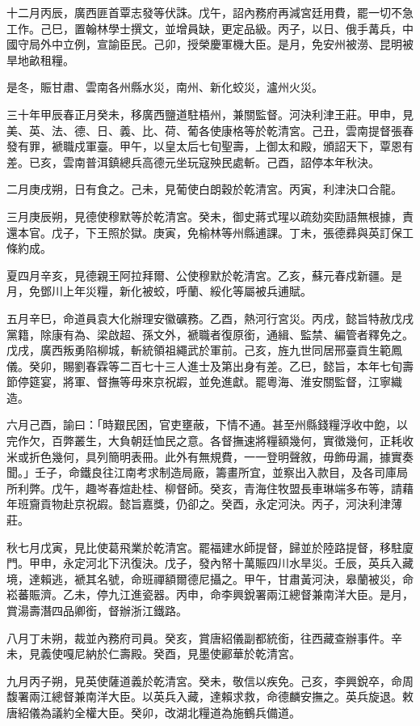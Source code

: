 \begin{pinyinscope}
十二月丙辰，廣西匪首覃志發等伏誅。戊午，詔內務府再減宮廷用費，罷一切不急工作。己巳，置翰林學士撰文，並增員缺，更定品級。丙子，以日、俄手冓兵，中國守局外中立例，宣諭臣民。己卯，授榮慶軍機大臣。是月，免安州被澇、昆明被旱地畝租糧。

是冬，賑甘肅、雲南各州縣水災，南州、新化蛟災，瀘州火災。

三十年甲辰春正月癸未，移廣西鹽道駐梧州，兼關監督。河決利津王莊。甲申，見美、英、法、德、日、義、比、荷、葡各使康格等於乾清宮。己丑，雲南提督張春發有罪，褫職戍軍臺。甲午，以皇太后七旬聖壽，上御太和殿，頒詔天下，覃恩有差。已亥，雲南普洱鎮總兵高德元坐玩寇殃民處斬。己酉，詔停本年秋決。

二月庚戌朔，日有食之。己未，見葡使白朗穀於乾清宮。丙寅，利津決口合龍。

三月庚辰朔，見德使穆默等於乾清宮。癸未，御史蔣式瑆以疏劾奕劻語無根據，責還本官。戊子，下王照於獄。庚寅，免榆林等州縣逋課。丁未，張德彞與英訂保工條約成。

夏四月辛亥，見德親王阿拉拜爾、公使穆默於乾清宮。乙亥，蘇元春戍新疆。是月，免鄧川上年災糧，新化被蛟，呼蘭、綏化等屬被兵逋賦。

五月辛巳，命道員袁大化辦理安徽礦務。乙酉，熱河行宮災。丙戌，懿旨特赦戊戌黨籍，除康有為、梁啟超、孫文外，褫職者復原銜，通緝、監禁、編管者釋免之。戊戌，廣西叛勇陷柳城，斬統領祖繩武於軍前。己亥，旌九世同居邢臺貢生範鳳儀。癸卯，賜劉春霖等二百七十三人進士及第出身有差。乙巳，懿旨，本年七旬壽節停筵宴，將軍、督撫等毋來京祝嘏，並免進獻。罷粵海、淮安關監督，江寧織造。

六月己酉，諭曰：「時艱民困，官吏壅蔽，下情不通。甚至州縣錢糧浮收中飽，以完作欠，百弊叢生，大負朝廷恤民之意。各督撫速將糧額幾何，實徵幾何，正耗收米或折色幾何，具列簡明表冊。此外有無規費，一一登明聲敘，毋飾毋漏，據實奏聞。」壬子，命鐵良往江南考求制造局廠，籌畫所宜，並察出入款目，及各司庫局所利弊。戊午，趣岑春煊赴桂、柳督師。癸亥，青海住牧盟長車琳端多布等，請藉年班齎貢物赴京祝嘏。懿旨嘉獎，仍卻之。癸酉，永定河決。丙子，河決利津薄莊。

秋七月戊寅，見比使葛飛業於乾清宮。罷福建水師提督，歸並於陸路提督，移駐廈門。甲申，永定河北下汛復決。戊子，發內帑十萬賑四川水旱災。壬辰，英兵入藏境，達賴逃，褫其名號，命班禪額爾德尼攝之。甲午，甘肅黃河決，皋蘭被災，命崧蕃賑濟。乙未，停九江進瓷器。丙申，命李興銳署兩江總督兼南洋大臣。是月，賞湯壽潛四品卿銜，督辦浙江鐵路。

八月丁未朔，裁並內務府司員。癸亥，賞唐紹儀副都統銜，往西藏查辦事件。辛未，見義使嘎尼納於仁壽殿。癸酉，見墨使酈華於乾清宮。

九月丙子朔，見英使薩道義於乾清宮。癸未，敬信以疾免。己亥，李興銳卒，命周馥署兩江總督兼南洋大臣。以英兵入藏，達賴求救，命德麟安撫之。英兵旋退。敕唐紹儀為議約全權大臣。癸卯，改湖北糧道為施鶴兵備道。


\end{pinyinscope}
